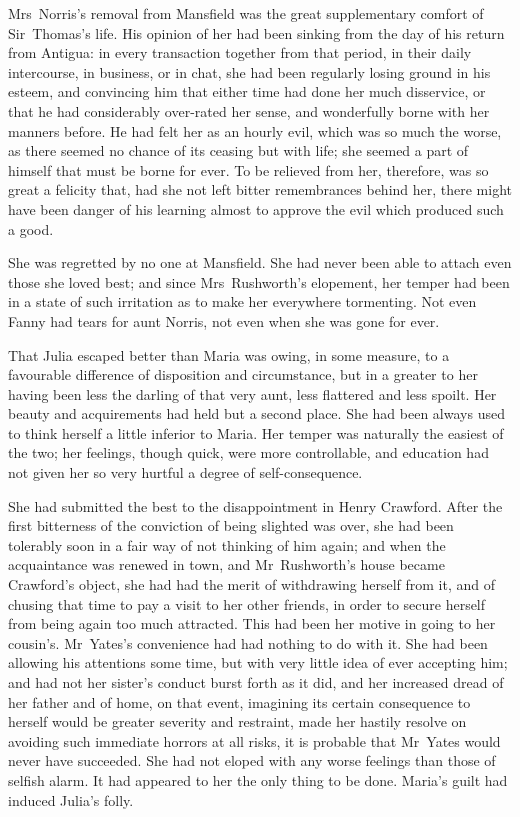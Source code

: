 Mrs~Norris's removal from Mansfield was the great supplementary comfort of Sir~Thomas's life. His opinion of her had been sinking from the day of his return from Antigua: in every transaction together from that period, in their daily intercourse, in business, or in chat, she had been regularly losing ground in his esteem, and convincing him that either time had done her much disservice, or that he had considerably over-rated her sense, and wonderfully borne with her manners before. He had felt her as an hourly evil, which was so much the worse, as there seemed no chance of its ceasing but with life; she seemed a part of himself that must be borne for ever. To be relieved from her, therefore, was so great a felicity that, had she not left bitter remembrances behind her, there might have been danger of his learning almost to approve the evil which produced such a good.

She was regretted by no one at Mansfield. She had never been able to attach even those she loved best; and since Mrs~Rushworth's elopement, her temper had been in a state of such irritation as to make her everywhere tormenting. Not even Fanny had tears for aunt Norris, not even when she was gone for ever.

That Julia escaped better than Maria was owing, in some measure, to a favourable difference of disposition and circumstance, but in a greater to her having been less the darling of that very aunt, less flattered and less spoilt. Her beauty and acquirements had held but a second place. She had been always used to think herself a little inferior to Maria. Her temper was naturally the easiest of the two; her feelings, though quick, were more controllable, and education had not given her so very hurtful a degree of self-consequence.

She had submitted the best to the disappointment in Henry Crawford. After the first bitterness of the conviction of being slighted was over, she had been tolerably soon in a fair way of not thinking of him again; and when the acquaintance was renewed in town, and Mr~Rushworth's house became Crawford's object, she had had the merit of withdrawing herself from it, and of chusing that time to pay a visit to her other friends, in order to secure herself from being again too much attracted. This had been her motive in going to her cousin's. Mr~Yates's convenience had had nothing to do with it. She had been allowing his attentions some time, but with very little idea of ever accepting him; and had not her sister's conduct burst forth as it did, and her increased dread of her father and of home, on that event, imagining its certain consequence to herself would be greater severity and restraint, made her hastily resolve on avoiding such immediate horrors at all risks, it is probable that Mr~Yates would never have succeeded. She had not eloped with any worse feelings than those of selfish alarm. It had appeared to her the only thing to be done. Maria's guilt had induced Julia's folly.

